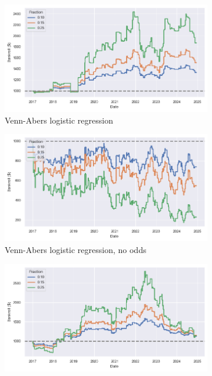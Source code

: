\documentclass[12pt,twoside]{report}
\begin{document}
\begin{figure}[!htb]
\centering
\captionsetup{justification=centering}
\begin{subfigure}{.5\linewidth}
  \centering
  \includegraphics[width=\linewidth]{figures/bankroll_va_lr_distributional_robust.png}
  \caption{Venn-Abers logistic regression}
\end{subfigure}%
\begin{subfigure}{.5\linewidth}
  \centering
  \includegraphics[width=\linewidth]{figures/bankroll_va_lr_no_odds_distributional_robust.png}
  \caption{Venn-Abers logistic regression, no odds}
\end{subfigure}
\begin{subfigure}{.5\linewidth}
  \centering
  \includegraphics[width=\linewidth]{figures/bankroll_va_lightgbm_distributional_robust.png}

\end{subfigure}
\end{figure}
\end{document}
